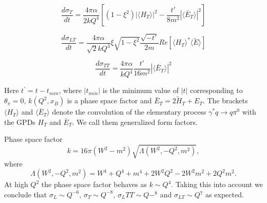 \documentclass[prc,floatfix,superscriptaddress]{revtex4}
\newcommand{\GPDHT}{\langle H_T \rangle}
\newcommand{\GPDETbar}{\langle \bar{E}_T \rangle}
\begin{document}
\begin{equation}
\label{ST}
\frac{d\sigma_{T}}{dt} = \frac{4\pi\alpha}{2k Q^4} \left[ \left(1-\xi^2\right) \left|\GPDHT\right|^2 - \frac{t'}{8m^2} \left|\GPDETbar\right|^2\right]
\end{equation}

\begin{equation}
\label{SLT}
\frac{d\sigma_{LT}}{dt} = \frac{4\pi\alpha}{\sqrt{2}k Q^3} \xi \sqrt{1-\xi^2} \frac{\sqrt{-t'}}{2m} { Re} \left[ \langle H_T\rangle^* \langle\tilde{E}\rangle \right]
\end{equation}

\begin{equation}
\label{STT}
\frac{d\sigma_{TT}}{dt} = \frac{4\pi\alpha}{k Q^4}\frac{t'}{16m^2}\left|\GPDETbar\right|^2
\end{equation}

\noindent 
Here  $t^\prime =t-t_{min}$, where $|t_{min}|$ is the minimum value of $|t|$ corresponding to $\theta_\pi =0$, $k(Q^2,x_B)$ is a phase space factor and  $\bar E_T = 2\widetilde H_T + E_T$.
The brackets $\langle  H_T \rangle$ and $\langle \bar E_T \rangle$ denote
the convolution of the elementary process 
$\gamma^*q\to q\pi^0$
with the GPDs $H_T$ and $\bar E_T$. We call them generalized form factors.

Phase space factor
\begin{equation}
\label{ps}
k=16\pi(W^2-m^2)\sqrt{\Lambda(W^2,-Q^2,m^2)},
\end{equation}
\noindent
where
\begin{equation}
\label{LAMBDA}
\Lambda(W^2,-Q^2,m^2)=W^4+Q^4+m^4+2W^2Q^2-2W^2m^2+2Q^2m^2.
\end{equation}
At high $Q^2$ the phase space factor behaves as $k\sim Q^4$. Taking this into account we conclude that 
$\sigma_L\sim Q^{-6}$,
$\sigma_T\sim Q^{-8}$,
$\sigma_L{TT}\sim Q{-^8}$ and 
$\sigma_{LT}\sim Q{^7}$ as expected.
\end{document}
